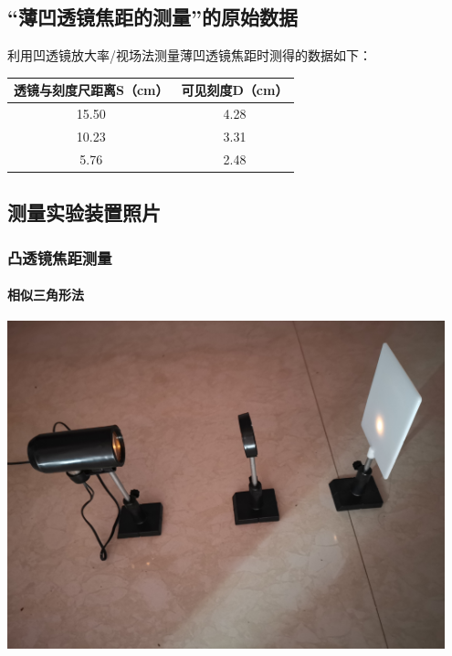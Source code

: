 \documentclass[UTF8]{ctexart}
\begin{document}
\subsection{“薄凹透镜焦距的测量”的原始数据}
利用凹透镜放大率/视场法测量薄凹透镜焦距时测得的数据如下：
\begin{table}[htbp!] 
\centering 
\begin{tabular}{|c|c|} 
\hline 
透镜与刻度尺距离S（cm） &  可见刻度D（cm）  \\ 
\hline 
15.50 & 4.28 \\ 
\hline 
10.23 & 3.31 \\ 
\hline 
5.76 & 2.48  \\ 
\hline
\end{tabular} 
\end{table}
\subsection{测量实验装置照片}
\subsubsection{凸透镜焦距测量}
\paragraph{相似三角形法}
\begin{center} 
\includegraphics[width=0.95\textwidth]{A.jpg} 
\end{center}
\end{document}
